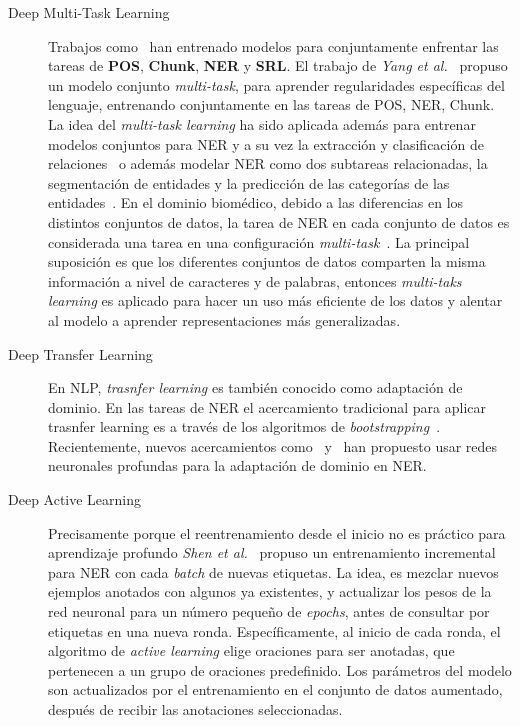 \begin{description}
	\item[Deep Multi-Task Learning] Trabajos como~\cite{collobert2011natural} han entrenado modelos para conjuntamente enfrentar las tareas de \textbf{POS}, \textbf{Chunk}, \textbf{NER} y \textbf{SRL}. El trabajo de \emph{Yang et al.}~\cite{yang2016multi} propuso un modelo conjunto \emph{multi-task}, para aprender regularidades espec\'ificas del lenguaje, entrenando conjuntamente en las tareas de POS, NER, Chunk. La idea del \emph{multi-task learning} ha sido aplicada adem\'as para entrenar modelos conjuntos para NER y a su vez la extracci\'on y clasificaci\'on de relaciones~\cite{zhou2017joint} o adem\'as modelar NER como dos subtareas relacionadas, la segmentaci\'on de entidades y la predicci\'on de las categor\'ias de las entidades~\cite{aguilar2019multi}. En el dominio biom\'edico, debido a las diferencias en los distintos conjuntos de datos, la tarea de NER en cada conjunto de datos es considerada una tarea en una configuraci\'on \emph{multi-task}~\cite{wang2019cross}. La principal suposici\'on es que los diferentes conjuntos de datos comparten la misma informaci\'on a nivel de caracteres y de palabras, entonces \emph{multi-taks learning} es aplicado para hacer un uso m\'as eficiente de los datos y alentar al modelo a aprender representaciones m\'as generalizadas.
	
	\item[Deep Transfer Learning] En NLP, \emph{trasnfer learning} es tambi\'en conocido como adaptaci\'on de dominio. En las tareas de NER el acercamiento tradicional para aplicar trasnfer learning es a trav\'es de los algoritmos de \emph{bootstrapping}~\cite{wu2009domain}. Recientemente, nuevos acercamientos como~\cite{lee2017transfer} y~\cite{giorgi2018transfer}  han propuesto usar redes neuronales profundas para la adaptaci\'on de dominio en NER.
	
	\item[Deep Active Learning] Precisamente porque el reentrenamiento desde el inicio no es pr\'actico para aprendizaje profundo \emph{Shen et al.}~\cite{shen2017deep} propuso un entrenamiento incremental para NER con cada \emph{batch} de nuevas etiquetas. La idea, es mezclar nuevos ejemplos anotados con algunos ya existentes, y actualizar los pesos de la red neuronal para un n\'umero peque\~no de \emph{epochs}, antes de consultar por etiquetas en una nueva ronda. Espec\'ificamente, al inicio de cada ronda, el algoritmo de \emph{active learning} elige oraciones para ser anotadas, que pertenecen a un grupo de oraciones predefinido. Los par\'ametros del modelo son actualizados por el entrenamiento en el conjunto de datos aumentado, despu\'es de recibir las anotaciones seleccionadas.
	

\end{description}
